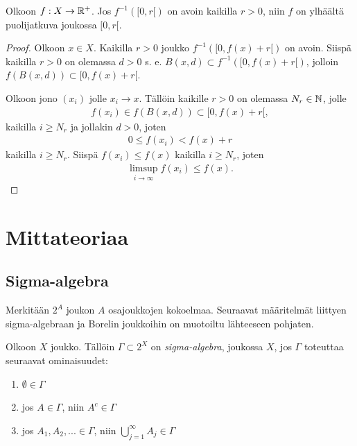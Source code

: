\documentclass[12pt,oneside,a4paper]{amsbook} %
\begin{document}
\begin{lemma}\label{le:openPreimageImpliesUSC}
    Olkoon $f:X \to {\mathbb{R}^{+}}$. Jos $f^{-1}([0, r[)$ on avoin kaikilla $r > 0$, niin $f$ on ylhäältä puolijatkuva joukossa $[0, r[$.
\end{lemma}
\begin{proof}
    Olkoon $x \in X$. Kaikilla $r > 0$ joukko $f^{-1}([0, f(x) + r[)$ on avoin. Siispä kaikilla $r > 0$ on olemassa $d > 0$ s. e. $B(x, d) \subset f^{-1}([0, f(x) + r[)$, jolloin $f(B(x,d)) \subset [0, f(x) + r[$.
    
    Olkoon jono $(x_i)$ jolle $x_i \to x$. Tällöin kaikille $r > 0$ on olemassa $N_r \in \mathbb{N}$, jolle
    \begin{align*}
        f(x_i) \in f(B(x, d)) \subset [0, f(x) + r[,
    \end{align*}
    kaikilla $i \ge N_r$ ja jollakin $d > 0$, joten
    \begin{align*}
        0 \le f(x_i) < f(x) + r
    \end{align*}
    kaikilla $i \ge N_r$. Siispä $f(x_i) \le f(x)$ kaikilla $i \ge N_r$, joten
    \begin{align*}
        \limsup_{i\to \infty}f(x_i) \le f(x).
    \end{align*}
\end{proof}


\section{Mittateoriaa}
\subsection{Sigma-algebra}
Merkitään $2^A$ joukon $A$ osajoukkojen kokoelmaa. Seuraavat määritelmät liittyen sigma-algebraan ja Borelin joukkoihin on muotoiltu lähteeseen \cite[s. 86-87]{lehrbäck} pohjaten.

\begin{definition}
    Olkoon $X$ joukko. Tällöin $\Gamma \subset 2^X$ on \textit{sigma-algebra}, joukossa $X$, jos $\Gamma$ toteuttaa seuraavat ominaisuudet:
    \begin{enumerate}
        \item $\emptyset \in \Gamma$ 
        \item jos $A \in \Gamma$, niin $A^c \in \Gamma$
        \item jos $A_1, A_2, ... \in \Gamma$, niin $\bigcup_{j=1}^\infty A_j \in \Gamma$ 
    \end{enumerate}
\end{definition}
\end{document}
